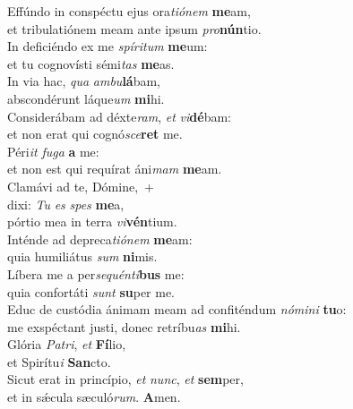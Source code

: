 \evenverse Effúndo in conspéctu ejus ora\textit{ti}\textit{ó}\textit{nem} \textbf{me}am,~\*\\
\evenverse et tribulatiónem meam ante ipsum \textit{pro}\textbf{nún}tio.\\
\oddverse In deficiéndo ex me \textit{spí}\textit{ri}\textit{tum} \textbf{me}um:~\*\\
\oddverse et tu cognovísti sémi\textit{tas} \textbf{me}as.\\
\evenverse In via hac, \textit{qua} \textit{am}\textit{bu}\textbf{lá}bam,~\*\\
\evenverse abscondérunt láque\textit{um} \textbf{mi}hi.\\
\oddverse Considerábam ad déxte\textit{ram}, \textit{et} \textit{vi}\textbf{dé}bam:~\*\\
\oddverse et non erat qui cognó\textit{sce}\textbf{ret} me.\\
\evenverse Péri\textit{it} \textit{fu}\textit{ga} \textbf{a} me:~\*\\
\evenverse et non est qui requírat áni\textit{mam} \textbf{me}am.\\
\oddverse Clamávi ad te, Dómine,~+\\
\oddverse  dixi: \textit{Tu} \textit{es} \textit{spes} \textbf{me}a,~\*\\
\oddverse pórtio mea in terra \textit{vi}\textbf{vén}tium.\\
\evenverse Inténde ad depreca\textit{ti}\textit{ó}\textit{nem} \textbf{me}am:~\*\\
\evenverse quia humiliátus \textit{sum} \textbf{ni}mis.\\
\oddverse Líbera me a per\textit{se}\textit{quén}\textit{ti}\textbf{bus} me:~\*\\
\oddverse quia confortáti \textit{sunt} \textbf{su}per me.\\
\evenverse Educ de custódia ánimam meam ad confiténdum \textit{nó}\textit{mi}\textit{ni} \textbf{tu}o:~\*\\
\evenverse me exspéctant justi, donec retríbu\textit{as} \textbf{mi}hi.\\
\oddverse Glória \textit{Pa}\textit{tri}, \textit{et} \textbf{Fí}lio,~\*\\
\oddverse et Spirítu\textit{i} \textbf{San}cto.\\
\evenverse Sicut erat in princípio, \textit{et} \textit{nunc}, \textit{et} \textbf{sem}per,~\*\\
\evenverse et in sǽcula sæculó\textit{rum}. \textbf{A}men.\\
